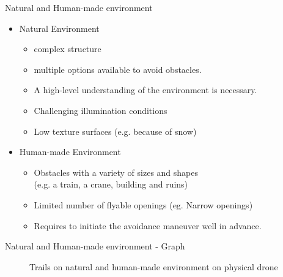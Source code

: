 \documentclass{beamer}
\begin{document}
\begin{frame}{Natural and Human-made environment}
	\begin{itemize}
		\item Natural Environment
		\begin{itemize}
			\item complex structure
			\item multiple options available to avoid obstacles. 
			\item A high-level understanding of the environment is necessary.
			\item Challenging illumination conditions
			\item Low texture surfaces (e.g. because of snow)
		\end{itemize}
	
		\item Human-made Environment
		\begin{itemize}
			\item Obstacles with a variety of sizes and shapes \\
			(e.g. a train, a crane, building and ruins)
			\item Limited number of flyable openings (eg. Narrow openings)
			\item Requires to initiate the avoidance maneuver well in advance.
		\end{itemize}
	\end{itemize}	
\end{frame}

\begin{frame}{Natural and Human-made environment - Graph }
	\begin{figure}
		\caption{Trails on natural and human-made environment on physical drone}
	\end{figure}
\end{frame}
\end{document}
